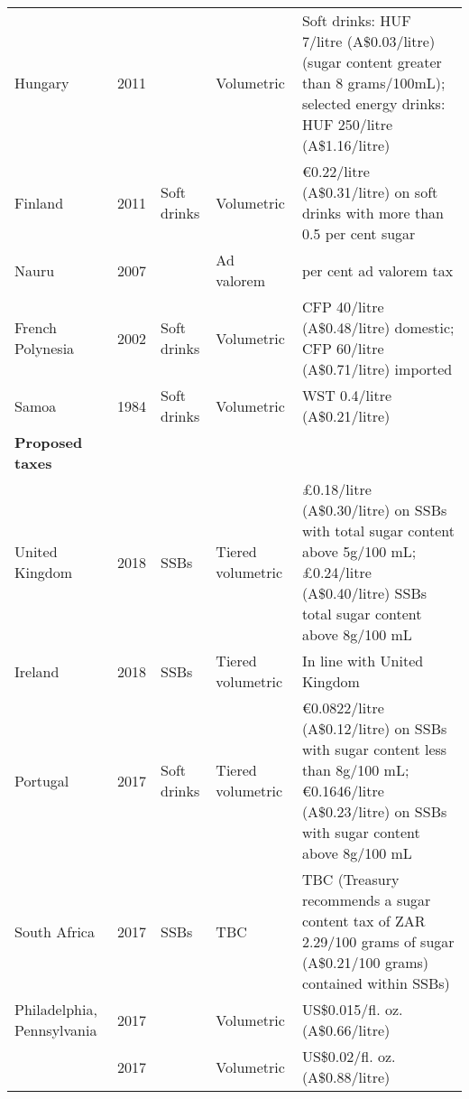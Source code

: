 \begin{tabularx}{\textwidth}{>{\footnotesize}l>{\footnotesize}c>{\footnotesize}l>{\footnotesize}l*1{>{\footnotesize\arraybackslash}X}}
Hungary
 & 2011 & \multicolumn{1}{>{\footnotesize}p{4cm}}{Soft drinks and energy drinks} & Volumetric &  Soft drinks: HUF 7/litre (A\$0.03/litre) (sugar content greater than 8 grams/100mL); selected energy drinks: HUF 250/litre (A\$1.16/litre) \\

Finland
 & 2011 & Soft drinks & Volumetric & \euro{}0.22/litre (A\$0.31/litre) on soft drinks with more than 0.5 per cent sugar \\

Nauru
 & 2007 & \multicolumn{1}{>{\footnotesize}p{4cm}}{SSBs and flavoured milk} & Ad valorem & 30 per cent ad valorem tax \\

French Polynesia
 & 2002 & Soft drinks & Volumetric & CFP 40/litre (A\$0.48/litre) domestic; CFP 60/litre (A\$0.71/litre) imported \\

Samoa
 & 1984 & Soft drinks & Volumetric & WST 0.4/litre (A\$0.21/litre) \\ \midrule


\textbf{Proposed taxes}
 & & ~ & ~ & \\ \cmidrule(lr){1-5}

United Kingdom
 & 2018 & SSBs & Tiered volumetric & \pounds{0.18}/litre (A\$0.30/litre) on SSBs with total sugar content above 5g/100 mL; \pounds{0.24}/litre (A\$0.40/litre) SSBs total sugar content above 8g/100 mL \\

Ireland
 & 2018 & SSBs & Tiered volumetric & In line with United Kingdom \\ 

Portugal
 & 2017 & Soft drinks & Tiered volumetric & \euro{}0.0822/litre (A\$0.12/litre) on SSBs with sugar content less than 8g/100 mL; \euro{}0.1646/litre (A\$0.23/litre) on SSBs with sugar content above 8g/100 mL \\

South Africa
 & 2017 & SSBs & TBC & TBC (Treasury recommends a sugar content tax of ZAR 2.29/100 grams of sugar (A\$0.21/100 grams) contained within SSBs) \\

{Philadelphia,
Pennsylvania}
 & 2017 & \multicolumn{1}{>{\footnotesize}p{4cm}}{SSBs and artificially sweetened beverages} & Volumetric & US\$0.015/fl. oz. (A\$0.66/litre) \\
 
\multicolumn{1}{>{\footnotesize}p{3.5cm}}{Boulder, Colorado}
 & 2017 & \multicolumn{1}{>{\footnotesize}p{4cm}}{SSBs} & Volumetric & US\$0.02/fl. oz. (A\$0.88/litre) \\
 

\end{tabularx}
